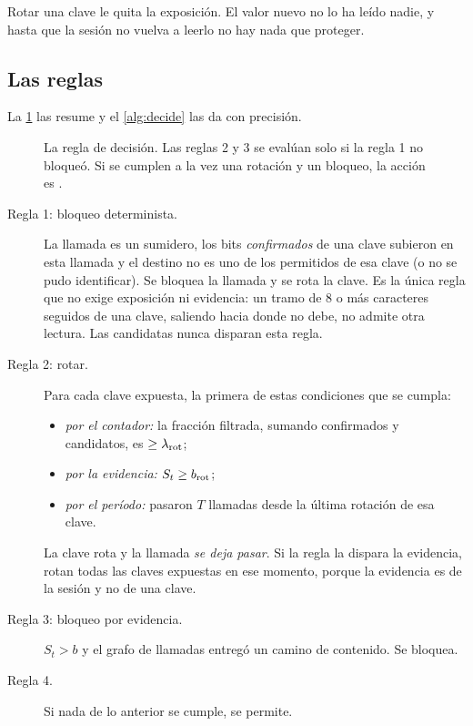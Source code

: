 Rotar una clave le quita la exposición. El valor nuevo no lo ha leído nadie, y hasta que la sesión no
vuelva a leerlo no hay nada que proteger.

\subsection{Las reglas}

La \cref{fig:decision} las resume y el \cref{alg:decide} las da con precisión.

\begin{figure}[ht]
\centering

\caption{La regla de decisión. Las reglas 2 y 3 se evalúan solo si la regla 1 no bloqueó. Si se
cumplen a la vez una rotación y un bloqueo, la acción es .}
\label{fig:decision}
\end{figure}

\begin{description}
  \item[Regla 1: bloqueo determinista.] La llamada es un sumidero, los bits \emph{confirmados} de una
    clave subieron en esta llamada y el destino no es uno de los permitidos de esa clave (o no se
    pudo identificar). Se bloquea la llamada y se rota la clave. Es la única regla que no exige
    exposición ni evidencia: un tramo de 8 o más caracteres seguidos de una clave, saliendo hacia
    donde no debe, no admite otra lectura. Las candidatas nunca disparan esta regla.
  \item[Regla 2: rotar.] Para cada clave expuesta, la primera de estas condiciones que se cumpla:
    \begin{itemize}
      \item \emph{por el contador:} la fracción filtrada, sumando confirmados y candidatos, es
        $\geq \lambda_{\mathrm{rot}}$;
      \item \emph{por la evidencia:} $S_t \geq b_{\mathrm{rot}}$;
      \item \emph{por el período:} pasaron $T$ llamadas desde la última rotación de esa clave.
    \end{itemize}
    La clave rota y la llamada \emph{se deja pasar}. Si la regla la dispara la evidencia, rotan todas
    las claves expuestas en ese momento, porque la evidencia es de la sesión y no de una clave.
  \item[Regla 3: bloqueo por evidencia.] $S_t > b$ y el grafo de llamadas entregó un camino de
    contenido. Se bloquea.
  \item[Regla 4.] Si nada de lo anterior se cumple, se permite.
\end{description}

